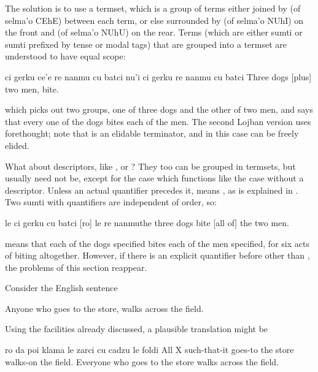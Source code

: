 The solution is to use a termset, which is a group of terms
    either joined by  (of selma'o CEhE) between each term,
    or else surrounded by  (of selma'o NUhI) on the front
    and  (of selma'o NUhU) on the rear. Terms (which are
    either sumti or sumti prefixed by tense or modal tags) that are
    grouped into a termset are understood to have equal scope:
\begin{example}
ci gerku ce'e re nanmu cu batci\n
nu'i ci gerku re nanmu  cu batci\n
Three dogs [plus] two men, bite.
\end{example}

{\noindent}which picks out two groups, one of three dogs and the other of
    two men, and says that every one of the dogs bites each of the
    men. The second Lojban version uses forethought; note that
     is an elidable terminator, and in this case can be
    freely elided. 

What about descriptors, like , 
    or ? They too can be grouped in termsets, but
    usually need not be, except for the  case which functions
    like the case without a descriptor. Unless an actual quantifier
    precedes it,  means , as is
    explained in . Two sumti with
     quantifiers are independent of order, so:
\begin{example}
[ro] le ci gerku cu batci [ro] le re nanmu\n
[All of] the three dogs bite [all of] the two men.
\end{example}

{\noindent}means that each of the dogs specified bites each of the men
    specified, for six acts of biting altogether. However, if there
    is an explicit quantifier before  other than , the
    problems of this section reappear.




Consider the English sentence
\begin{example}
Anyone who goes to the store, walks across the field.
\end{example}

Using the facilities already discussed, a plausible
    translation might be
\begin{example}
ro da poi klama le zarci cu cadzu le foldi\n
All X such-that-it goes-to the store walks-on the field.\n
Everyone who goes to the store walks across the field.
\end{example}

